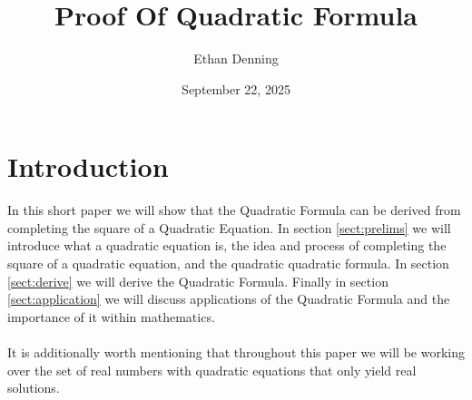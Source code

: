 \documentclass{article}
\title{Proof Of Quadratic Formula}
\author{Ethan Denning}
\date{September 22, 2025}
\theoremstyle{plain}
\theoremstyle{definition}
\begin{document}
   
\maketitle


\section{Introduction}
In this short paper we will show that the Quadratic Formula can be derived from completing the square of a Quadratic Equation. In section \ref{sect:prelims} we will introduce what a quadratic equation is, the idea and process of completing the square of a quadratic equation, and the quadratic quadratic formula. In section \ref{sect:derive} we will derive the Quadratic Formula. Finally in section \ref{sect:application} we will discuss applications of the Quadratic Formula and the importance of it within mathematics.\\\\
It is additionally worth mentioning that throughout this paper we will be working over the set of real numbers with quadratic equations that only yield real solutions. 
\end{document}
